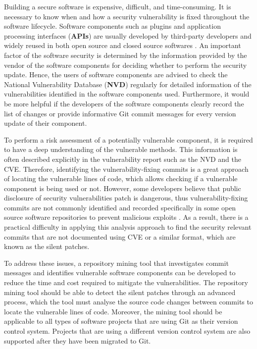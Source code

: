 \documentclass[12pt, a4paper]{report}
\begin{document}
Building a secure software is expensive, difficult, and time-consuming. It is necessary to know when
and how a security vulnerability is fixed throughout the software lifecycle. Software components
such as plugins and application processing interfaces (\textbf{APIs}) are usually developed by
third-party developers and widely reused in both open source and closed source softwares
\cite{khan_2001}. An important factor of the software security is determined by the
information provided by the vendor of the software components for deciding whether to perform
the security update. Hence, the users of software components are advised to check the National
Vulnerability Database (\textbf{NVD}) \cite{nvd} regularly for detailed information of the
vulnerabilities identified in the software components used. Furthermore, it would be more helpful if
the developers of the software components clearly record the list of changes or provide informative
Git commit messages for every version update of their component.

To perform a risk assessment of a potentially vulnerable component, it is required to have a deep
understanding of the vulnerable methods. This information is often described explicitly in the
vulnerability report such as the NVD and the CVE. Therefore, identifying the vulnerability-fixing
commits is a great approach of locating the vulnerable lines of code, which allows checking if a
vulnerable component is being used or not. However, some developers believe that public disclosure
of security vulnerabilities patch is dangerous, thus vulnerability-fixing commits are not commonly
identified and recorded specifically in some open source software repositories to prevent malicious
exploits \cite{arora_2005}. As a result, there is a practical difficulty in applying this analysis
approach to find the security relevant commits that are not documented using CVE or a similar
format, which are known as the silent patches.

To address these issues, a repository mining tool that investigates commit messages and identifies
vulnerable software components can be developed to reduce the time and cost required to mitigate the
vulnerabilities. The repository mining tool should be able to detect the silent patches through an
advanced process, which the tool must analyse the source code changes between commits to locate the
vulnerable lines of code. Moreover, the mining tool should be applicable to all types of software
projects that are using Git as their version control system. Projects that are using a different
version control system are also supported after they have been migrated to Git.
\end{document}
